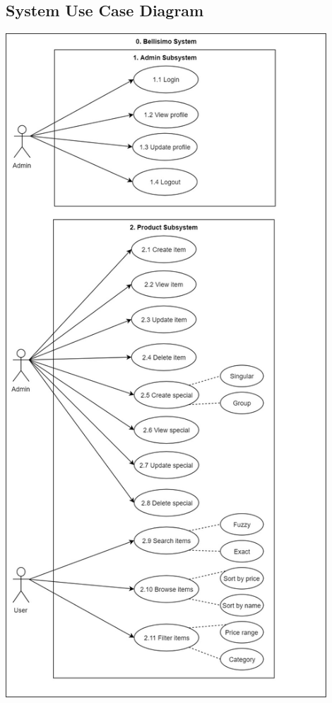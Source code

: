 \documentclass[a4paper,10pt]{article}
\begin{document}
\subsection{System Use Case Diagram}
\includegraphics[width=12cm]{System_Use_Case_Diagram.jpg}
\end{document}
